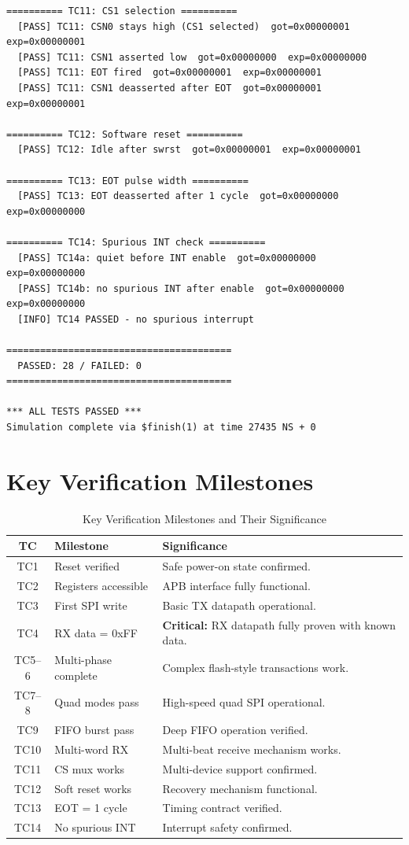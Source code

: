 \begin{lstlisting}[basicstyle=\ttfamily\scriptsize,numbers=none,frame=single,breaklines=true]
========== TC11: CS1 selection ==========
  [PASS] TC11: CSN0 stays high (CS1 selected)  got=0x00000001  exp=0x00000001
  [PASS] TC11: CSN1 asserted low  got=0x00000000  exp=0x00000000
  [PASS] TC11: EOT fired  got=0x00000001  exp=0x00000001
  [PASS] TC11: CSN1 deasserted after EOT  got=0x00000001  exp=0x00000001

========== TC12: Software reset ==========
  [PASS] TC12: Idle after swrst  got=0x00000001  exp=0x00000001

========== TC13: EOT pulse width ==========
  [PASS] TC13: EOT deasserted after 1 cycle  got=0x00000000  exp=0x00000000

========== TC14: Spurious INT check ==========
  [PASS] TC14a: quiet before INT enable  got=0x00000000  exp=0x00000000
  [PASS] TC14b: no spurious INT after enable  got=0x00000000  exp=0x00000000
  [INFO] TC14 PASSED - no spurious interrupt

========================================
  PASSED: 28 / FAILED: 0
========================================

*** ALL TESTS PASSED ***
Simulation complete via $finish(1) at time 27435 NS + 0
\end{lstlisting}

\section{Key Verification Milestones}

\begin{table}[H]
\centering
\caption{Key Verification Milestones and Their Significance}
\label{tab:milestones}
\begin{tabularx}{\textwidth}{@{}clX@{}}
\toprule
\textbf{TC} & \textbf{Milestone} & \textbf{Significance} \\
\midrule
TC1  & Reset verified & Safe power-on state confirmed. \\
TC2  & Registers accessible & APB interface fully functional. \\
TC3  & First SPI write & Basic TX datapath operational. \\
TC4  & RX data = 0xFF & \textbf{Critical:} RX datapath fully proven with known data. \\
TC5--6 & Multi-phase complete & Complex flash-style transactions work. \\
TC7--8 & Quad modes pass & High-speed quad SPI operational. \\
TC9  & FIFO burst pass & Deep FIFO operation verified. \\
TC10 & Multi-word RX & Multi-beat receive mechanism works. \\
TC11 & CS mux works & Multi-device support confirmed. \\
TC12 & Soft reset works & Recovery mechanism functional. \\
TC13 & EOT = 1 cycle & Timing contract verified. \\
TC14 & No spurious INT & Interrupt safety confirmed. \\
\bottomrule
\end{tabularx}
\end{table}

